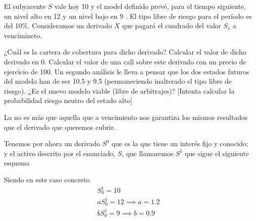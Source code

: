 \begin{problem}[2]
El subyacente $S$ vale hoy 10 \texteuro y el model definido prevé, para el tiempo siguiente, un nivel alto en 12 \texteuro y un nivel bajo en 9 \texteuro. El tipo libre de riesgo para el período es del 10\%. Consideramos un derivado $X$ que pagará el cuadrado del valor $S_1$ a vencimineto.

\ppart ¿Cuál es la cartera de cobertura para dicho derivado?
\ppart Calcular el valor de dicho derivado en 0.
\ppart Calcular el valor de una call sobre este derivado con un precio de ejercicio de 100.
\ppart Un segundo análisis le lleva a pensar que los dos estados futuros del modelo han de ser 10.5 y 9.5 (permaneciendo inalterado el tipo libre de riesgo). ¿Es el nuevo modelo viable (libre de arbitrajes)? [Intenta calcular la probabilidad riesgo neutro del estado alto]

\solution

\spart

La  no es más que aquella que a vencimiento nos garantiza los mismos resultados que el derivado que queremos cubrir.

Tenemos por ahora un derivado $S^0$ que es la  que tiene un interés fijo y conocido; y el activo descrito por el enunciado, $S$, que llamaremos $S^1$ que sigue el siguiente esquema

\begin{minipage}{0.48\textwidth}
\begin{center}
\end{center}
\end{minipage}
\begin{minipage}{0.48\textwidth}
Siendo en este caso concreto
\[\begin{array}{l}
S_0^1 = 10 \\
aS_0^1 = 12 \implies a = 1.2 \\
bS_0^1 = 9 \implies b = 0.9
\end{array}\]
\end{minipage}


\end{problem}
